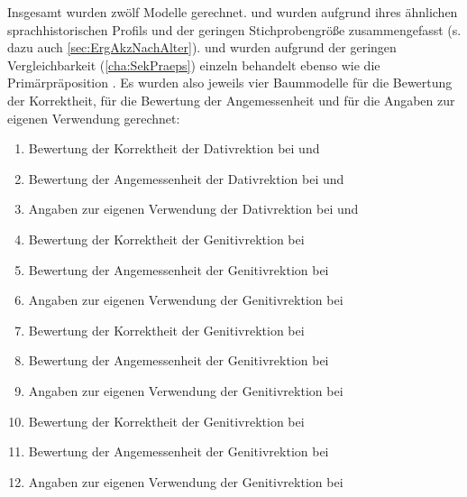Insgesamt wurden zwölf Modelle gerechnet.
 und \waehrend{} wurden aufgrund ihres ähnlichen sprachhistorischen Profils und der geringen Stichprobengröße zusammengefasst (s. dazu auch \autoref{sec:ErgAkzNachAlter}). 
 und \gegenueber{} wurden aufgrund der geringen Vergleichbarkeit (\autoref{cha:SekPraeps}) einzeln behandelt ebenso wie die Primärpräposition .
Es wurden also jeweils vier Baummodelle für die Bewertung der Korrektheit, für die Bewertung der Angemessenheit und für die Angaben zur eigenen Verwendung gerechnet: 
\begin{enumerate}
\item Bewertung der Korrektheit der Dativrektion bei \wegen{} und \waehrend
\item Bewertung der Angemessenheit der Dativrektion bei \wegen{} und \waehrend
\item Angaben zur eigenen Verwendung der Dativrektion bei \wegen{} und \waehrend
\item Bewertung der Korrektheit der Genitivrektion bei \dank
\item Bewertung der Angemessenheit der Genitivrektion bei \dank
\item Angaben zur eigenen Verwendung der Genitivrektion bei \dank
\item Bewertung der Korrektheit der Genitivrektion bei \gegenueber
\item Bewertung der Angemessenheit der Genitivrektion bei \gegenueber
\item Angaben zur eigenen Verwendung der Genitivrektion bei \gegenueber
\item Bewertung der Korrektheit der Genitivrektion bei 
\item Bewertung der Angemessenheit der Genitivrektion bei 
\item Angaben zur eigenen Verwendung der Genitivrektion bei 
\end{enumerate}

